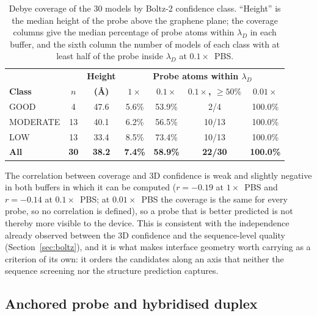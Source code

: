 \begin{table}[H]
\begin{center}
\begin{tabular}{l c c c c c c}
\hline
 & & \textbf{Height} & \multicolumn{4}{c}{\textbf{Probe atoms within $\lambda_D$}} \\
\textbf{Class} & \textbf{$n$} & \textbf{(\AA)} & \textbf{$1\times$} & \textbf{$0.1\times$} &
\textbf{$0.1\times$, $\geq 50\%$} & \textbf{$0.01\times$} \\
\hline
GOOD & 4 & 47.6 & 5.6\% & 53.9\% & 2/4 & 100.0\% \\
MODERATE & 13 & 40.1 & 6.2\% & 56.5\% & 10/13 & 100.0\% \\
LOW & 13 & 33.4 & 8.5\% & 73.4\% & 10/13 & 100.0\% \\
\hline
\textbf{All} & \textbf{30} & \textbf{38.2} & \textbf{7.4\%} & \textbf{58.9\%} & \textbf{22/30} & \textbf{100.0\%} \\
\hline
\end{tabular}
\end{center}
\caption[Debye coverage by confidence class]{Debye coverage of the $30$ models by Boltz-2
confidence class. ``Height'' is the median
height of the probe above the graphene plane; the coverage columns give the median percentage of
probe atoms within $\lambda_D$ in each buffer, and the sixth column the number of models of each
class with at least half of the probe inside $\lambda_D$ at $0.1\times$~PBS.}
\label{tab:debyeclass}
\end{table}

The correlation between coverage and 3D confidence is weak and slightly negative in both buffers in
which it can be computed ($r = -0.19$ at $1\times$~PBS and
$r = -0.14$ at $0.1\times$~PBS; at $0.01\times$~PBS the
coverage is the same for every probe, so no correlation is defined), so a probe that is better
predicted is not thereby more visible to the device. This is consistent with the independence already observed between the 3D
confidence and the sequence-level quality (Section~\ref{sec:boltz}), and it is what makes interface
geometry worth carrying as a criterion of its own: it orders the candidates along an axis that
neither the sequence screening nor the structure prediction captures.

\subsection{Anchored probe and hybridised duplex}

